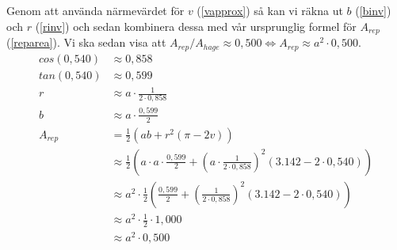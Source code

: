 \documentclass[10pt]{article}
\begin{document}
  Genom att använda närmevärdet för $v$ (\ref{vapprox}) så kan vi räkna ut $b$ (\ref{binv}) och $r$ (\ref{rinv}) och sedan kombinera dessa med vår ursprunglig formel för $A_{rep}$ (\ref{reparea}). Vi ska sedan visa att $A_{rep} / A_{hage} \approx 0,500 \Leftrightarrow A_{rep} \approx a^2 \cdot 0,500$.
  \begin{align}
    cos(0,540) &\approx 0,858 \nonumber \\
    tan(0,540) &\approx 0,599 \nonumber \\
    r &\approx a \cdot \frac{1}{2 \cdot 0,858} \nonumber \\
    b &\approx a \cdot \frac{0,599}{2} \nonumber \\
    A_{rep} &= \frac{1}{2} \left( ab + r^2(\pi-2v) \right) \nonumber \\
    &\approx \frac{1}{2} \left( a \cdot a \cdot \frac{0,599}{2} + (a \cdot \frac{1}{2 \cdot 0,858})^2(3.142 - 2 \cdot 0,540) \right) \nonumber \\
    &\approx a^2 \cdot \frac{1}{2} \left( \frac{0,599}{2} + (\frac{1}{2 \cdot 0,858})^2(3.142 - 2 \cdot 0,540) \right) \nonumber \\
    &\approx a^2 \cdot \frac{1}{2} \cdot 1,000 \nonumber \\
    &\approx a^2 \cdot 0,500
  \end{align}
\end{document}
